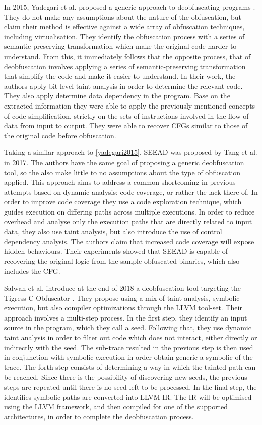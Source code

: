 In 2015, Yadegari et al. proposed a generic approach to deobfuscating programs \cite{yadegari2015}. They do not make any assumptions about the nature of the obfuscation, but claim their method is effective against a wide array of obfuscation techniques, including virtualisation. They identify the obfuscation process with a series of semantic-preserving transformation which make the original code harder to understand. From this, it immediately follows that the opposite process, that of deobfuscation involves applying a series of semantic-preserving transformation that simplify the code and make it easier to understand. In their work, the authors apply bit-level taint analysis in order to determine the relevant code. They also apply determine data dependency in the program. Base on the extracted information they were able to apply the previously mentioned concepts of code simplification, strictly on the sets of instructions involved in the flow of data from input to output. They were able to recover \glspl{CFG} similar to those of the original code before obfuscation.

Taking a similar approach to \ref{yadegari2015}, SEEAD \cite{tang2017seead} was proposed by Tang et al. in 2017. The authors have the same goal of proposing a generic deobfuscation tool, so the also make little to no assumptions about the type of obfuscation applied. This approach aims to address a common shortcoming in previous attempts based on dynamic analysis: code coverage, or rather the lack there of. In order to improve code coverage they use a code exploration technique, which guides execution on differing paths across multiple executions. In order to reduce overhead and analyse only the execution paths that are directly related to input data, they also use taint analysis, but also introduce the use of control dependency analysis. The authors claim that increased code coverage will expose hidden behaviours. Their experiments showed that SEEAD is capable of recovering the original logic from the sample obfuscated binaries, which also includes the \gls{CFG}.

Salwan et al. introduce at the end of 2018 a deobfuscation tool targeting the Tigress C Obfuscator \cite{slawan2018} \cite{tigress}. They propose using a mix of taint analysis, symbolic execution, but also compiler optimizations through the LLVM \cite{llvm} tool-set. Their approach involves a multi-step process. In the first step, they identify an input source in the program, which they call a seed. Following that, they use dynamic taint analysis in order to filter out code which does not interact, either directly or indirectly with the seed. The sub-trace resulted in the previous step is then used in conjunction with symbolic execution in order obtain generic a symbolic of the trace. The forth step consists of determining a way in which the tainted path can be reached. Since there is the possibility of discovering new seeds, the previous steps are repeated until there is no seed left to be processed. In the final step, the identifies symbolic paths are converted into LLVM \gls{IR}. The \gls{IR} will be optimised using the LLVM framework, and then compiled for one of the supported architectures, in order to complete the deobfuscation process.

